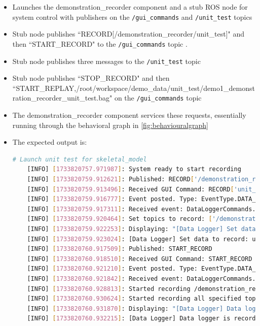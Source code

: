 \documentclass{CSSRforAfrica}
\begin{document}
\begin{itemize}
    \item Launches the demonstration\_recorder component and a stub ROS node for system control with publishers on the \texttt{/gui\_commands} and \texttt{/unit\_test} topics
    \item Stub node publishes ``RECORD[/demonstration\_recorder/unit\_test]" and then ``START\_RECORD" to the \texttt{/gui\_commands} topic .
    \item Stub node publishes three messages to the \texttt{/unit\_test} topic
    \item Stub node publishes ``STOP\_RECORD" and then \\ ``START\_REPLAY,/root/workspace/demo\_data/unit\_test/demo1\_demonstration\_recorder\_unit\_test.bag" on the \texttt{/gui\_commands} topic
    \item The demonstration\_recorder component services these requests, essentially running through the behavioral graph in \cref{fig:behaviouralgraph}
    \item The expected output is:
    \begin{lstlisting}[style=withoutNumbering, language=bash]
    # Launch unit test for skeletal_model
    [INFO] [1733820757.971987]: System ready to start recording
    [INFO] [1733820759.912621]: Published: RECORD['/demonstration_recorder/unit_test']
    [INFO] [1733820759.913496]: Received GUI Command: RECORD['unit_test']
    [INFO] [1733820759.916777]: Event posted. Type: EventType.DATA_LOGGING, Command: DataLoggerCommands.SET_TOPICS
    [INFO] [1733820759.917311]: Received event: DataLoggerCommands.SET_TOPICS
    [INFO] [1733820759.920464]: Set topics to record: ['/demonstration_recorder/unit_test']
    [INFO] [1733820759.922253]: Displaying: "[Data Logger] Set data to record: unit_test "
    [INFO] [1733820759.923024]: [Data Logger] Set data to record: unit_test 
    [INFO] [1733820760.917509]: Published: START_RECORD
    [INFO] [1733820760.918510]: Received GUI Command: START_RECORD
    [INFO] [1733820760.921210]: Event posted. Type: EventType.DATA_LOGGING, Command: DataLoggerCommands.START_RECORD
    [INFO] [1733820760.921842]: Received event: DataLoggerCommands.START_RECORD
    [INFO] [1733820760.928813]: Started recording /demonstration_recorder/unit_test in /root/workspace/demo_data/unit_test/demo_1_demonstration_recorder_unit_test.bag
    [INFO] [1733820760.930624]: Started recording all specified topics
    [INFO] [1733820760.931870]: Displaying: "[Data Logger] Data logger is recording now."
    [INFO] [1733820760.932215]: [Data Logger] Data logger is recording now.

\end{lstlisting}
\end{itemize}
\end{document}
